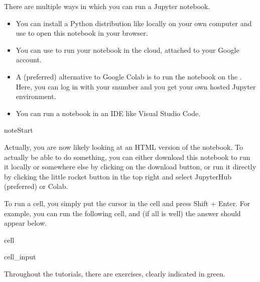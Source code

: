 \documentclass[letterpaper,10pt,english]{jupyterBook}
\begin{document}
\sphinxAtStartPar
There are multiple ways in which you can run a Jupyter notebook.
\begin{itemize}
\item {} 
\sphinxAtStartPar
You can install a Python distribution like  locally on your own computer and use  to open this notebook in your browser.

\item {} 
\sphinxAtStartPar
You can use  to run your notebook in the cloud, attached to your Google account.

\item {} 
\sphinxAtStartPar
A (preferred) alternative to Google Colab is to run the notebook on the . Here, you can log in with your s\sphinxhyphen{}number and you get your own hosted Jupyter environment.

\item {} 
\sphinxAtStartPar
You can run a notebook in an IDE like Visual Studio Code.

\end{itemize}

\begin{sphinxadmonition}{note}{Start}

\sphinxAtStartPar
Actually, you are now likely looking at an HTML version of the notebook. To actually be able to do something, you can either download this notebook to run it locally or somewhere else by clicking on the download button, or run it directly by clicking the little rocket button in the top right and select JupyterHub (preferred) or Colab.
\end{sphinxadmonition}



\sphinxAtStartPar
To run a cell, you simply put the cursor in the cell and press Shift + Enter. For example, you can run the following cell, and (if all is well) the answer should appear below.

\begin{sphinxuseclass}{cell}\begin{sphinxVerbatimInput}

\begin{sphinxuseclass}{cell_input}
\begin{sphinxVerbatim}[commandchars=\\\{\}]
\end{sphinxVerbatim}

\end{sphinxuseclass}\end{sphinxVerbatimInput}

\end{sphinxuseclass}
\sphinxAtStartPar
Throughout the tutorials, there are exercises, clearly indicated in green.
\end{document}
